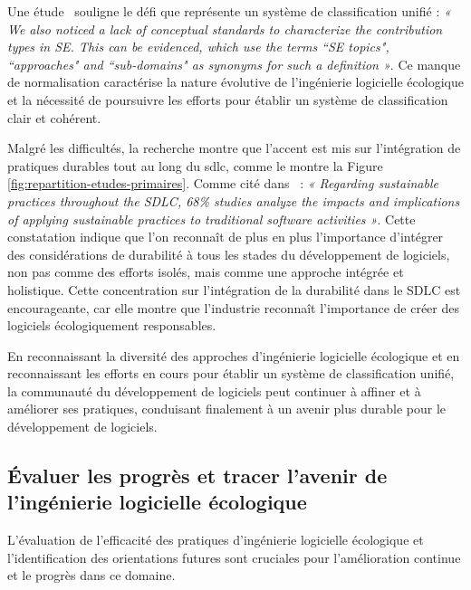Une étude~\cite{GreenSustainableEngMapping} souligne le défi que représente un système de classification unifié : \emph{« We also noticed a lack of conceptual standards to characterize the contribution types in SE. This can be evidenced, which use the terms “SE topics", “approaches" and “sub-domains" as synonyms for such a definition »}. Ce manque de normalisation caractérise la nature évolutive de l'ingénierie logicielle écologique et la nécessité de poursuivre les efforts pour établir un système de classification clair et cohérent.


Malgré les difficultés, la recherche montre que l'accent est mis sur l'intégration de pratiques durables tout au long du \acrshort{sdlc}, comme le montre la Figure \ref{fig:repartition-etudes-primaires}. Comme cité dans~\cite{GreenSustainableEngMapping} : \emph{« Regarding sustainable practices throughout the SDLC, 68\% studies analyze the impacts and implications of applying sustainable practices to traditional software activities »}. Cette constatation indique que l'on reconnaît de plus en plus l'importance d'intégrer des considérations de durabilité à tous les stades du développement de logiciels, non pas comme des efforts isolés, mais comme une approche intégrée et holistique. Cette concentration sur l'intégration de la durabilité dans le SDLC est encourageante, car elle montre que l'industrie reconnaît l'importance de créer des logiciels écologiquement responsables.

En reconnaissant la diversité des approches d'ingénierie logicielle écologique et en reconnaissant les efforts en cours pour établir un système de classification unifié, la communauté du développement de logiciels peut continuer à affiner et à améliorer ses pratiques, conduisant finalement à un avenir plus durable pour le développement de logiciels.


\subsection{Évaluer les progrès et tracer l'avenir de l'ingénierie logicielle écologique}
L'évaluation de l'efficacité des pratiques d'ingénierie logicielle écologique et l'identification des orientations futures sont cruciales pour l'amélioration continue et le progrès dans ce domaine.


